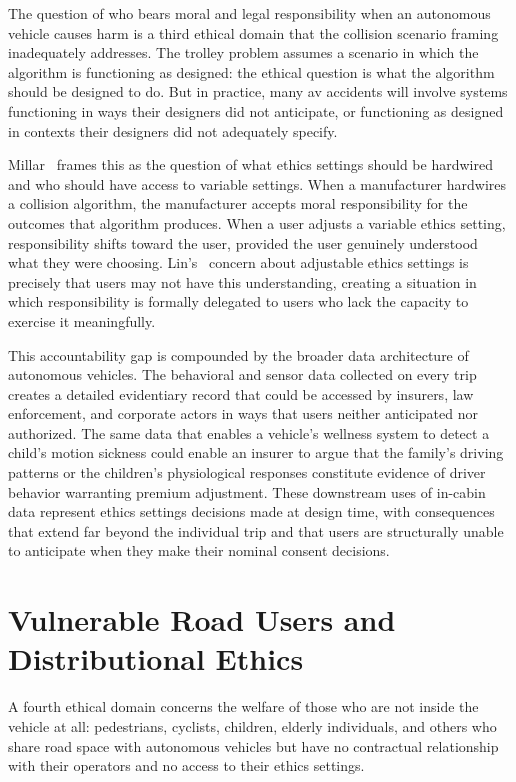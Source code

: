 \documentclass{ieee-portfolio}
\begin{document}
The question of who bears moral and legal responsibility when an autonomous vehicle causes harm is a third ethical domain that the collision scenario framing inadequately addresses. The trolley problem assumes a scenario in which the algorithm is functioning as designed: the ethical question is what the algorithm should be designed to do. But in practice, many \gls{av} accidents will involve systems functioning in ways their designers did not anticipate, or functioning as designed in contexts their designers did not adequately specify.
 
Millar~\cite{millar_ethics_2017} frames this as the question of what ethics settings should be hardwired and who should have access to variable settings. When a manufacturer hardwires a collision algorithm, the manufacturer accepts moral responsibility for the outcomes that algorithm produces. When a user adjusts a variable ethics setting, responsibility shifts toward the user, provided the user genuinely understood what they were choosing. Lin's~\cite{lin_heres_2014} concern about adjustable ethics settings is precisely that users may not have this understanding, creating a situation in which responsibility is formally delegated to users who lack the capacity to exercise it meaningfully.
 
This accountability gap is compounded by the broader data architecture of autonomous vehicles. The behavioral and sensor data collected on every trip creates a detailed evidentiary record that could be accessed by insurers, law enforcement, and corporate actors in ways that users neither anticipated nor authorized. The same data that enables a vehicle's wellness system to detect a child's motion sickness could enable an insurer to argue that the family's driving patterns or the children's physiological responses constitute evidence of driver behavior warranting premium adjustment. These downstream uses of in-cabin data represent ethics settings decisions made at design time, with consequences that extend far beyond the individual trip and that users are structurally unable to anticipate when they make their nominal consent decisions.
 
\section{Vulnerable Road Users and Distributional Ethics}
 
A fourth ethical domain concerns the welfare of those who are not inside the vehicle at all: pedestrians, cyclists, children, elderly individuals, and others who share road space with autonomous vehicles but have no contractual relationship with their operators and no access to their ethics settings.
 
\end{document}
